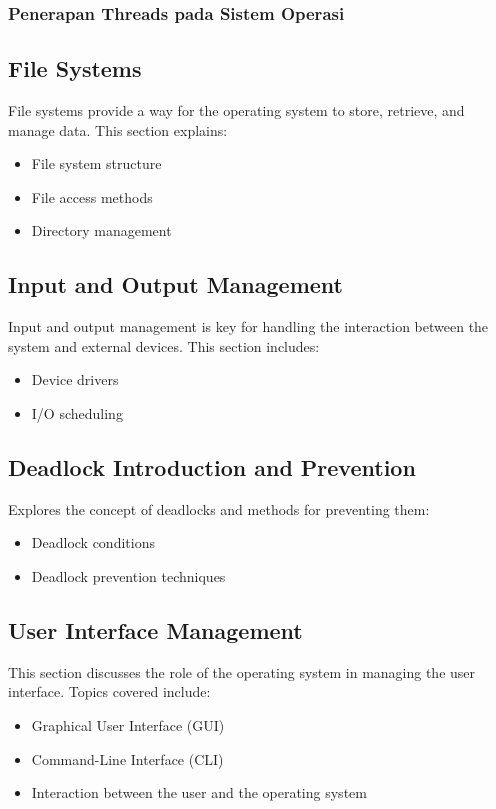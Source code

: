 \documentclass[12pt]{article}
\begin{document}
\subsubsection{Penerapan Threads pada Sistem Operasi}


\subsection{File Systems}
File systems provide a way for the operating system to store, retrieve, and manage data. This section explains:
\begin{itemize}
    \item File system structure
    \item File access methods
    \item Directory management
\end{itemize}

\subsection{Input and Output Management}
Input and output management is key for handling the interaction between the system and external devices. This section includes:
\begin{itemize}
    \item Device drivers
    \item I/O scheduling
\end{itemize}

\subsection{Deadlock Introduction and Prevention}
Explores the concept of deadlocks and methods for preventing them:
\begin{itemize}
    \item Deadlock conditions
    \item Deadlock prevention techniques
\end{itemize}

\subsection{User Interface Management}
This section discusses the role of the operating system in managing the user interface. Topics covered include:
\begin{itemize}
    \item Graphical User Interface (GUI)
    \item Command-Line Interface (CLI)
    \item Interaction between the user and the operating system
\end{itemize}
\end{document}
